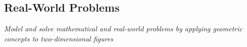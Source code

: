 \subsection{Real-World Problems}

\textit{Model and solve mathematical and real-world problems by applying geometric concepts to two-dimensional figures}

